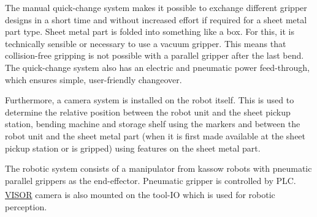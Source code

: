 The manual quick-change system makes it possible to exchange different gripper
designs in a short time and without increased effort if required for a sheet metal part type. Sheet metal
part is folded into something like a box. For this, it is technically sensible or necessary to use a
vacuum gripper.
This means that collision-free gripping is not possible with a parallel gripper after the last bend. The
quick-change system also has an electric and pneumatic power feed-through, which ensures simple,
user-friendly changeover.



Furthermore, a camera system is installed on the robot itself. This is used to determine the relative
position between the robot unit and the sheet pickup station, bending machine and storage shelf using the markers
and between the robot unit and the sheet metal part (when it is first made available at the
sheet pickup station or is gripped) using features on the sheet metal part.

The robotic system consists of a manipulator from kassow robots with pneumatic parallel grippers as the end-effector.
Pneumatic gripper is controlled by PLC. \hyperref[acro:VISOR]{VISOR\textsuperscript{\textregistered}} camera is also mounted on the tool-IO which is used for robotic perception.



